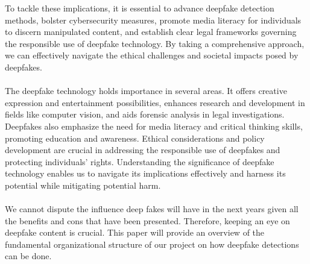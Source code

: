 To tackle these implications, it is essential to advance deepfake detection methods, bolster cybersecurity measures, promote media literacy for individuals to discern manipulated content, and establish clear legal frameworks governing the responsible use of deepfake technology. By taking a comprehensive approach, we can effectively navigate the ethical challenges and societal impacts posed by deepfakes.
\\\\
The deepfake technology holds importance in several areas. It offers creative expression and entertainment possibilities, enhances research and development in fields like computer vision, and aids forensic analysis in legal investigations. Deepfakes also emphasize the need for media literacy and critical thinking skills, promoting education and awareness. Ethical considerations and policy development are crucial in addressing the responsible use of deepfakes and protecting individuals' rights. Understanding the significance of deepfake technology enables us to navigate its implications effectively and harness its potential while mitigating potential harm.
\\\\
We cannot dispute the influence deep fakes will have in the next years given all the benefits and cons that have been presented. Therefore, keeping an eye on deepfake content is crucial. This paper will provide an overview of the fundamental organizational structure of our project on how deepfake detections can be done.